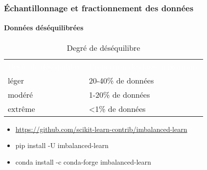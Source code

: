 \documentclass[xcolor=table]{beamer}
\begin{document}
\begin{frame}
	\frametitle{Échantillonnage et fractionnement des données}
	\framesubtitle{Données déséquilibrées}
	
	\begin{table}
		\begin{tabular}{p{}p{}}
			\rowcolor{darkblue}
			\textcolor{white}{Degré de déséquilibre} & \textcolor{white}{Proportion de classe minoritaire} \\
			léger & 20-40\% de données \\
			modéré & 1-20\% de données \\
			extrême &	\textless 1\% de données \\
		\end{tabular}
		\caption{Degré de déséquilibre \cite{2021-google-prep}}
	\end{table}

	\begin{itemize}
		\item \url{https://github.com/scikit-learn-contrib/imbalanced-learn}
		\item pip install -U imbalanced-learn
		\item conda install -c conda-forge imbalanced-learn
	\end{itemize}
	
\end{frame}
\end{document}
